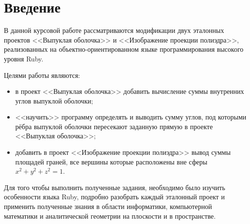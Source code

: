 \section{Введение}

В данной курсовой работе рассматриваются модификации двух эталонных проектов <<Выпуклая оболочка>> и <<Изображение проекции полиэдра>>, реализованных на объектно-ориентированном языке программирования высокого уровня Ruby.

Целями работы являются:
\begin{itemize}
\item в проект <<Выпуклая оболочка>> добавить вычисление суммы внутренних углов выпуклой оболочки;
\item <<научить>> программу определять и выводить сумму углов, под которыми рёбра выпуклой оболочки пересекают заданную прямую в проекте <<Выпуклая оболочка>>;
\item добавить в проект <<Изображение проекции полиэдра>> вывод суммы площадей граней, все вершины которые расположены вне сферы $x^2+y^2+z^2=1$.
\end{itemize}

Для того чтобы выполнить полученные задания, необходимо было изучить особенности языка Ruby, подробно разобрать каждый эталонный проект и применить полученные знания в области информатики, компьютерной математики и аналитической геометрии на плоскости и в пространстве.

\endinput

